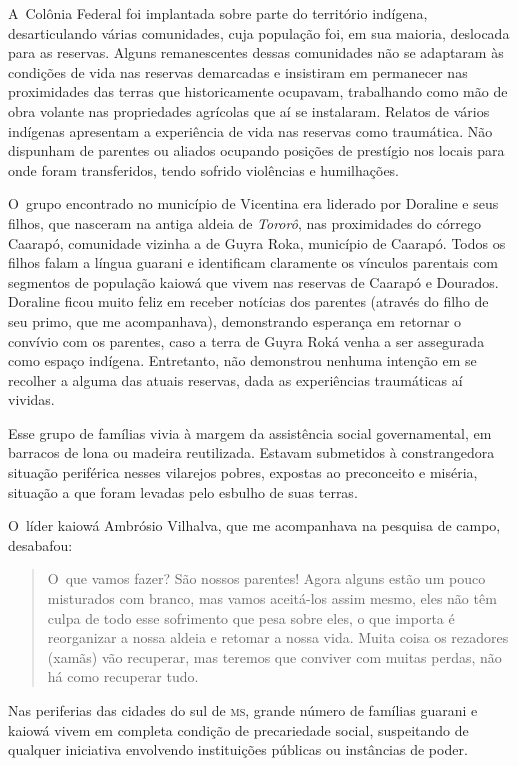 A~Colônia Federal foi implantada sobre parte do território indígena,
desarticulando várias comunidades, cuja população foi, em sua maioria,
deslocada para as reservas. Alguns remanescentes dessas comunidades não
se adaptaram às condições de vida nas reservas demarcadas e insistiram
em permanecer nas proximidades das terras que historicamente ocupavam,
trabalhando como mão de obra volante nas propriedades agrícolas que aí
se instalaram. Relatos de vários indígenas apresentam a experiência de
vida nas reservas como traumática. Não dispunham de parentes ou aliados
ocupando posições de prestígio nos locais para onde foram transferidos,
tendo sofrido violências e humilhações.

O~grupo encontrado no município de Vicentina era liderado por Doraline e
seus filhos, que nasceram na antiga aldeia de \emph{Tororô}, nas proximidades
do córrego Caarapó, comunidade vizinha a de Guyra Roka, município de
Caarapó. Todos os filhos falam a língua guarani e identificam
claramente os vínculos parentais com segmentos de população kaiowá que
vivem nas reservas de Caarapó e Dourados. Doraline ficou muito feliz em
receber notícias dos parentes (através do filho de seu primo, que me
acompanhava), demonstrando esperança em retornar o convívio com os
parentes, caso a terra de Guyra Roká venha a ser assegurada como espaço
indígena. Entretanto, não demonstrou nenhuma intenção em se recolher a
alguma das atuais reservas, dada as experiências traumáticas aí
vividas.

Esse grupo de famílias vivia à margem da assistência social
governamental, em barracos de lona ou madeira reutilizada. Estavam
submetidos à constrangedora situação periférica nesses vilarejos
pobres, expostas ao preconceito e miséria, situação a que foram levadas
pelo esbulho de suas terras.

O~líder kaiowá Ambrósio Vilhalva, que me acompanhava na pesquisa de
campo, desabafou:

\begin{quote}
O~que vamos fazer? São nossos parentes! Agora alguns estão um pouco
misturados com branco, mas vamos aceitá-los assim mesmo, eles não têm
culpa de todo esse sofrimento que pesa sobre eles, o que importa é
reorganizar a nossa aldeia e retomar a nossa vida. Muita coisa os
rezadores (xamãs) vão recuperar, mas teremos que conviver com muitas
perdas, não há como recuperar tudo.
\end{quote}

Nas periferias das cidades do sul de \textsc{ms}, grande número de famílias
guarani e kaiowá vivem em completa condição de precariedade social,
suspeitando de qualquer iniciativa envolvendo instituições públicas ou
instâncias de poder. 

